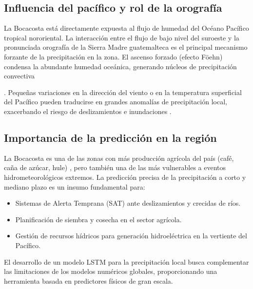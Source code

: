 \subsection{Influencia del pacífico y rol de la orografía}
La Bocacosta está directamente expuesta al flujo de humedad del Océano Pacífico tropical nororiental. La interacción entre el flujo de bajo nivel del suroeste y la pronunciada orografía de la Sierra Madre guatemalteca es el principal mecanismo forzante de la precipitación en la zona. El ascenso forzado (efecto Föehn) condensa la abundante humedad oceánica, generando núcleos de precipitación convectiva . Pequeñas variaciones en la dirección del viento o en la temperatura superficial del Pacífico pueden traducirse en grandes anomalías de precipitación local, exacerbando el riesgo de deslizamientos e inundaciones \citep{herrera2017descripcion, ramos2022influencia, avalosanalisis}.

\subsection{Importancia de la predicción en la región}
La Bocacosta es una de las zonas con más producción agrícola del país (café, caña de azúcar, hule) \citep{acosta2005contribucion, morales2007acceso}, pero también una de las más vulnerables a eventos hidrometeorológicos extremos. La predicción precisa de la precipitación a corto y mediano plazo es un insumo fundamental para:
\begin{itemize}
    \item Sistemas de Alerta Temprana (SAT) ante deslizamientos y crecidas de ríos.
    \item Planificación de siembra y cosecha en el sector agrícola.
    \item Gestión de recursos hídricos para generación hidroeléctrica en la vertiente del Pacífico.
\end{itemize}
El desarrollo de un modelo LSTM para la precipitación local busca complementar las limitaciones de los modelos numéricos globales, proporcionando una herramienta basada en predictores físicos de gran escala.
